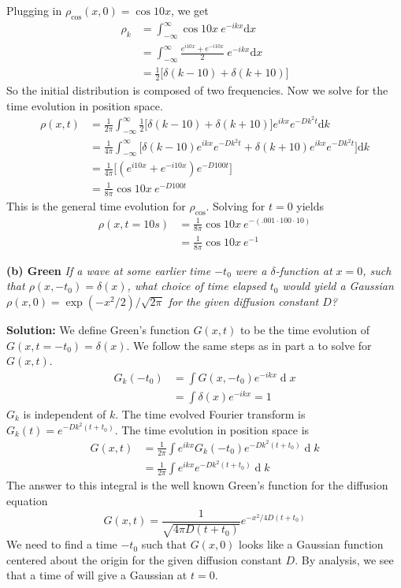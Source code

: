 \documentclass[11pt]{article}
\renewcommand{\d}[1]{\ensuremath{\operatorname{d}\!{#1}}}
\begin{document}
Plugging in $\rho_\text{cos}(x,0) = \cos{10x}$, we get
\begin{align*}
\rho_k &= \int_{-\infty}^{\infty} \cos{10x} \ e^{-ikx} \text{d}x
\\
       &= \int_{-\infty}^{\infty} \frac{e^{i10x} + e^{-i10x}}{2} \ e^{-ikx} \text{d}x
\\
			 &= \frac{1}{2} \Big[ \delta(k-10) + \delta(k+10) \Big]
\end{align*}
So the initial distribution is composed of two frequencies.
Now we solve for the time evolution in position space.
\begin{align*}
\rho(x,t) &= \frac{1}{2\pi} \int_{-\infty}^{\infty} \frac{1}{2} \Big[ \delta(k-10) + \delta(k+10) \Big] e^{ikx} e^{-Dk^2t} \text{d}k
\\
          &= \frac{1}{4\pi} \int_{-\infty}^{\infty} \Big[ \delta(k-10)e^{ikx} e^{-Dk^2t} + \delta(k+10)e^{ikx} e^{-Dk^2t} \Big] \text{d}k
					\\
					&= \frac{1}{4\pi} \Big[ (e^{i10x} + e^{-i10x}) e^{-D100t}  \Big]
					\\
					&= \frac{1}{8\pi} \cos{10x} \ e^{-D100t}
\end{align*}
This is the general time evolution for $\rho_\text{cos}$. Solving for $t =0$ yields
\begin{align*}
\rho(x, t = 10s) &=  \frac{1}{8\pi} \cos{10x}\  e^{-(.001\cdot100\cdot10)}
\\
&=  \boxed{ \frac{1}{8\pi} \cos{10x}\  e^{-1}}
\end{align*}

\vspace{2mm}
\noindent
\textbf{(b) Green}
\textit{If a wave at some earlier time $-t_0$ were a $\delta$-function at $x = 0$, such that $\rho(x,-t_0) = \delta(x)$, what choice of time elapsed $t_0$ would yield a Gaussian $\rho(x,0) = \exp(-x^2/2)/\sqrt{2\pi}$ for the given diffusion constant $D$?}

\vspace{2mm}
\noindent
\textbf{Solution:}
We define Green's function $G(x,t)$ to be the time evolution of $G(x,t=-t_0) = \delta(x)$. We follow the same steps as in part a to solve for $G(x,t).$
\begin{align*}
G_k(-t_0) &= \int G(x,-t_0) e^{-ikx}\d{x}
\\
          &= \int \delta(x) e^{-ikx} = 1
\end{align*}
$G_k$ is independent of $k$. The time evolved Fourier transform is $G_k(t) = e^{-Dk^2(t+t_0)}.$
The time evolution in position space is
\begin{align*}
G(x,t) &= \frac{1}{2\pi} \int e^{ikx} G_k(-t_0) e^{-Dk^2(t+t_0)} \d{k}
\\
       &= \frac{1}{2\pi} \int e^{ikx} e^{-Dk^2(t+t_0)} \d{k}
\end{align*}
The answer to this integral is the well known Green's function for the diffusion equation
$$
G(x,t) = \frac{1}{\sqrt{4\pi D(t+t_0)}} e^{-x^2/4D(t+t_0)}
$$
We need to find a time $-t_0$ such that $G(x,0)$ looks like a Gaussian function centered about the origin for the given diffusion constant $D.$ By analysis, we see that a time of  will give a Gaussian at $t=0$.
\end{document}
